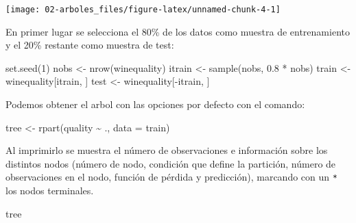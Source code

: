 \documentclass[
  spanish,
]{book}
\newenvironment{Shaded}{\begin{snugshade}}{\end{snugshade}}
\newcommand{\AttributeTok}[1]{\textcolor[rgb]{0.77,0.63,0.00}{#1}}
\newcommand{\DecValTok}[1]{\textcolor[rgb]{0.00,0.00,0.81}{#1}}
\newcommand{\FloatTok}[1]{\textcolor[rgb]{0.00,0.00,0.81}{#1}}
\newcommand{\FunctionTok}[1]{\textcolor[rgb]{0.00,0.00,0.00}{#1}}
\newcommand{\NormalTok}[1]{#1}
\newcommand{\OtherTok}[1]{\textcolor[rgb]{0.56,0.35,0.01}{#1}}
\newcommand{\SpecialCharTok}[1]{\textcolor[rgb]{0.00,0.00,0.00}{#1}}
\theoremstyle{break}
\theoremstyle{definition}
\theoremstyle{definition}
\theoremstyle{definition}
\theoremstyle{definition}
\theoremstyle{remark}
\begin{document}
\begin{Shaded}
\end{Shaded}

\begin{center}\texttt{[image: 02-arboles\_files/figure-latex/unnamed-chunk-4-1]} \end{center}

En primer lugar se selecciona el 80\% de los datos como muestra de entrenamiento y el 20\% restante como muestra de test:

\begin{Shaded}
\begin{Highlighting}[]
\FunctionTok{set.seed}\NormalTok{(}\DecValTok{1}\NormalTok{)}
\NormalTok{nobs }\OtherTok{\textless{}{-}} \FunctionTok{nrow}\NormalTok{(winequality)}
\NormalTok{itrain }\OtherTok{\textless{}{-}} \FunctionTok{sample}\NormalTok{(nobs, }\FloatTok{0.8} \SpecialCharTok{*}\NormalTok{ nobs)}
\NormalTok{train }\OtherTok{\textless{}{-}}\NormalTok{ winequality[itrain, ]}
\NormalTok{test }\OtherTok{\textless{}{-}}\NormalTok{ winequality[}\SpecialCharTok{{-}}\NormalTok{itrain, ]}
\end{Highlighting}
\end{Shaded}

Podemos obtener el arbol con las opciones por defecto con el comando:

\begin{Shaded}
\begin{Highlighting}[]
\NormalTok{tree }\OtherTok{\textless{}{-}} \FunctionTok{rpart}\NormalTok{(quality }\SpecialCharTok{\textasciitilde{}}\NormalTok{ ., }\AttributeTok{data =}\NormalTok{ train)}
\end{Highlighting}
\end{Shaded}

Al imprimirlo se muestra el número de observaciones e información
sobre los distintos nodos (número de nodo, condición que define la partición,
número de observaciones en el nodo, función de pérdida y predicción),
marcando con un \texttt{*} los nodos terminales.

\begin{Shaded}
\begin{Highlighting}[]
\NormalTok{tree}
\end{Highlighting}
\end{Shaded}
\end{document}
